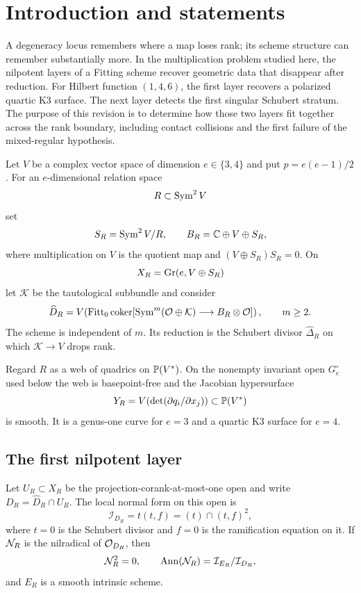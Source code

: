 \section{Introduction and statements}

A degeneracy locus remembers where a map loses rank; its scheme
structure can remember substantially more.  In the multiplication
problem studied here, the nilpotent layers of a Fitting scheme recover
geometric data that disappear after reduction.  For Hilbert function
\((1,4,6)\), the first layer recovers a polarized quartic K3 surface.
The next layer detects the first singular Schubert stratum.  The
purpose of this revision is to determine how those two layers fit
together across the rank boundary, including contact collisions and
the first failure of the mixed-regular hypothesis.

Let \(V\) be a complex vector space of dimension
\(e\in\{3,4\}\) and put \(p=e(e-1)/2\).  For an \(e\)-dimensional
relation space
\[
 R\subset\operatorname{Sym}^2V
\]
set
\[
 S_R=\operatorname{Sym}^2V/R,\qquad
 B_R=\mathbb C\oplus V\oplus S_R,
\]
where multiplication on \(V\) is the quotient map and
\((V\oplus S_R)S_R=0\).  On
\[
 X_R=\operatorname{Gr}(e,V\oplus S_R)
\]
let \(\mathcal K\) be the tautological subbundle and consider
\begin{equation}\label{eq:failure-intro}
 \widehat D_R=
 V\!\left(
 \operatorname{Fitt}_0\operatorname{coker}[
 \operatorname{Sym}^m(\mathcal O\oplus\mathcal K)\longrightarrow
 B_R\otimes\mathcal O]\right),
 \qquad m\ge2.
\end{equation}
The scheme is independent of \(m\).  Its reduction is the Schubert
divisor \(\widehat\Delta_R\) on which
\(\mathcal K\to V\) drops rank.

Regard \(R\) as a web of quadrics on \(\mathbb P(V^*)\).  On the nonempty
invariant open \(G_e^\circ\) used below the web is basepoint-free and
the Jacobian hypersurface
\begin{equation}\label{eq:Y-intro}
 Y_R=
 V\!\left(\det(\partial q_i/\partial x_j)\right)
 \subset\mathbb P(V^*)
\end{equation}
is smooth.  It is a genus-one curve for \(e=3\) and a quartic K3
surface for \(e=4\).

\subsection*{The first nilpotent layer}

Let \(U_R\subset X_R\) be the projection-corank-at-most-one open and
write \(D_R=\widehat D_R\cap U_R\).  The local normal form on this open
is
\[
 \mathcal I_{D_R}=t(t,f)=(t)\cap(t,f)^2,
\]
where \(t=0\) is the Schubert divisor and \(f=0\) is the ramification
equation on it.  If \(\mathcal N_R\) is the nilradical of
\(\mathcal O_{D_R}\), then
\[
 \mathcal N_R^2=0,\qquad
 \operatorname{Ann}(\mathcal N_R)=\mathcal I_{E_R}/\mathcal I_{D_R},
\]
and \(E_R\) is a smooth intrinsic scheme.

